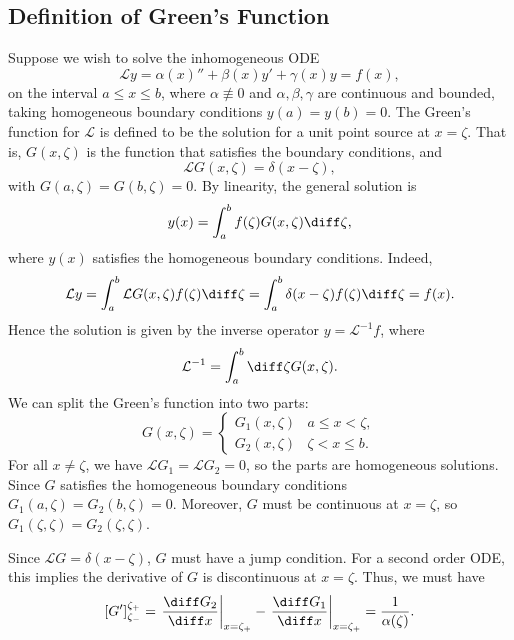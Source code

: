 \documentclass[12pt]{article}
\begin{document}
\subsection{Definition of Green's Function}%
\label{sub:definition_of_green_s_function}

Suppose we wish to solve the inhomogeneous ODE
\[
	\mathcal{L} y = \alpha(x) '' + \beta(x) y' + \gamma(x) y = f(x)
,\]
on the interval $a \leq x \leq b$, where $\alpha \not \equiv 0$ and $\alpha, \beta, \gamma$ are continuous and bounded, taking homogeneous boundary conditions $y(a) = y(b) = 0$. The Green's function for $\mathcal{L}$ is defined to be the solution for a unit point source at $x = \zeta$. That is, $G(x, \zeta)$ is the function that satisfies the boundary conditions, and
\[
	\mathcal{L}G(x, \zeta) = \delta(x - \zeta)
,\]
with $G(a, \zeta) = G(b, \zeta) = 0$. By linearity, the general solution is
\[
	y(x) = \int_{a}^{b} f(\zeta)G(x, \zeta) \diff \zeta
,\]
where $y(x)$ satisfies the homogeneous boundary conditions. Indeed,
\[
	\mathcal{L}y = \int_{a}^{b}\mathcal{L}G(x, \zeta)f(\zeta)\diff \zeta = \int_{a}^{b}\delta(x - \zeta)f(\zeta)\diff \zeta = f(x)
.\]
Hence the solution is given by the inverse operator $y = \mathcal{L}^{-1} f$, where
\[
	\mathcal{L}^{-1} = \int_{a}^{b} \diff \zeta G(x, \zeta)
.\]
We can split the Green's function into two parts:
\[
	G(x, \zeta) =
	\begin{cases}
		G_1(x, \zeta) & a \leq x < \zeta, \\
		G_2(x, \zeta) & \zeta < x \leq b.
	\end{cases}
\]
For all $x \neq \zeta$, we have $\mathcal{L}G_1 = \mathcal{L}G_2 = 0$, so the parts are homogeneous solutions. Since $G$ satisfies the homogeneous boundary conditions $G_1(a, \zeta) = G_2(b, \zeta) = 0$. Moreover, $G$ must be continuous at $x = \zeta$, so $G_1(\zeta, \zeta) = G_2(\zeta, \zeta)$.

Since $\mathcal{L}G = \delta(x - \zeta)$, $G$ must have a jump condition. For a second order ODE, this implies the derivative of $G$ is discontinuous at $x = \zeta$. Thus, we must have
	\[
		[G']_{\zeta_{-}}^{\zeta_{+}} = \left. \frac{\diff G_2}{\diff x} \right|_{x = \zeta_{+}} - \left.\frac{\diff G_1}{\diff x} \right|_{x = \zeta_{+}} = \frac{1}{\alpha(\zeta)}
	.\]
\end{document}
